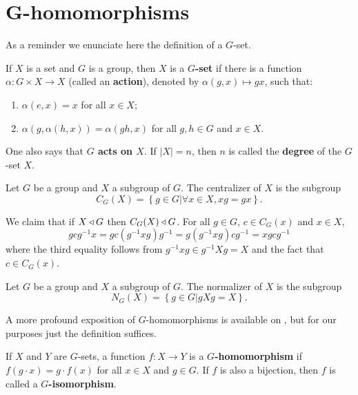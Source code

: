 \section{G-homomorphisms}

As a reminder we enunciate here the definition of a $G$-set.

\begin{definition}
    \cite[p.~55]{RotmanITG}
    If $X$ is a set and $G$ is a group, then $X$ is a \textbf{$G$-set} if there is a function $\alpha : G \times X \to X$ (called an \textbf{action}), denoted by $\alpha(g, x) \mapsto gx$, such that:
    \begin{enumerate}
    \item $\alpha(e, x) = x$ for all $x \in X$;
    \item $\alpha(g, \alpha(h, x)) = \alpha(gh, x)$ for all $g, h \in G$ and $x \in X$.
    \end{enumerate}
    One also says that \textbf{$G$ acts on $X$}. If $|X| = n$, then $n$ is called the \textbf{degree} of the $G$-set $X$.
\end{definition}

\begin{definition}
    Let $G$ be a group and $X$ a subgroup of $G$. The centralizer of $X$ is the subgroup
    $$
    C_G(X) = \left\{ g \in G | \forall x \in X, xg = gx \right\}.
    $$
\end{definition}

We claim that if $X \triangleleft G$ then $C_G(X) \triangleleft G$. For all $g \in G$, $c \in C_G(x)$ and $x \in X$,
$$
gcg^{-1}x = gc(g^{-1}xg)g^{-1} = g(g^{-1}xg)cg^{-1} = xgcg^{-1} 
$$
where the third equality follows from $g^{-1}xg \in g^{-1}Xg = X$ and the fact that $c \in C_G(x)$.

\begin{definition}
    Let $G$ be a group and $X$ a subgroup of $G$. The normalizer of $X$ is the subgroup
    $$
    N_G(X) = \left\{ g \in G | gXg = X \right\}.
    $$
\end{definition}

A more profound exposition of $G$-homomorphisms is available on \cite[p.~260]{RotmanITG}, but for our purposes just the definition suffices.

\begin{definition}
    If $X$ and $Y$ are $G$-sets, a function $f: X \rightarrow Y$ is a \textbf{$G$-homomorphism} if $f(g \cdot x) = g \cdot f(x)$ for all $x \in X$ and $g \in G$. If $f$ is also a bijection, then $f$ is called a \textbf{$G$-isomorphism}.

\end{definition}